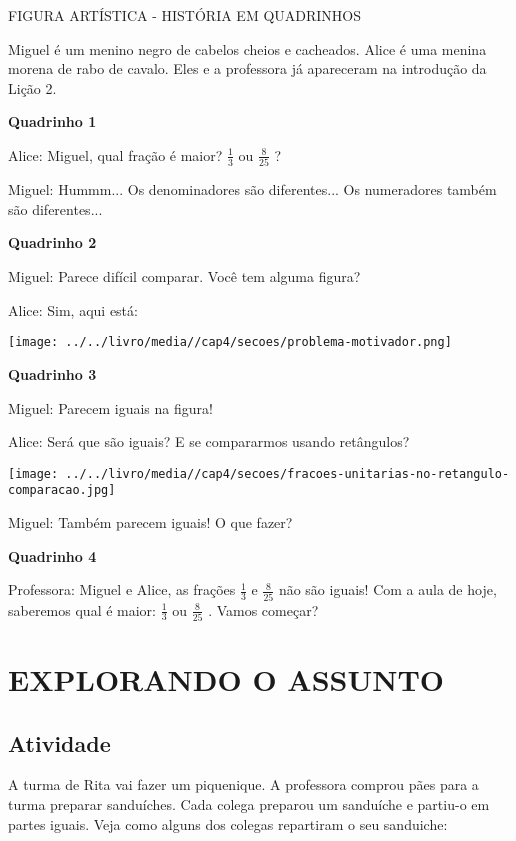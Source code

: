 \documentclass[a4,12pt]{book}
\begin{document}
\begin{imagem*}[breakable]{}{}   FIGURA ARTÍSTICA -  
  HISTÓRIA EM QUADRINHOS  
  
  Miguel é um menino negro de cabelos cheios e cacheados. Alice é uma menina morena de rabo de cavalo. Eles e a professora já apareceram na introdução da Lição 2.  
  
  {\bf Quadrinho 1}  
  
  Alice: Miguel, qual fração é maior?   $\frac{1}{3}$   ou   $\frac{8}{25}$  ?  
  
  Miguel: Hummm... Os denominadores são diferentes... Os numeradores também são diferentes...  
  
  {\bf Quadrinho 2}  
  
  Miguel: Parece difícil comparar. Você tem alguma figura?  
  
  Alice: Sim, aqui está:  
  
    \texttt{[image: ../../livro/media//cap4/secoes/problema-motivador.png]}  
  
  {\bf Quadrinho 3}  
  
  Miguel: Parecem iguais na figura!  
  
  Alice: Será que são iguais? E se compararmos usando retângulos?  
  
    \texttt{[image: ../../livro/media//cap4/secoes/fracoes-unitarias-no-retangulo-comparacao.jpg]}  
  
  Miguel: Também parecem iguais! O que fazer?  
     
  {\bf Quadrinho 4}  
  
  Professora: Miguel e Alice, as frações   $\frac{1}{3}$   e   $\frac{8}{25}$   não são iguais! Com a aula de hoje, saberemos qual é maior:    $\frac{1}{3}$   ou   $\frac{8}{25}$  . Vamos começar?  
\end{imagem*}


\section{EXPLORANDO O ASSUNTO }

\subsection{Atividade}

A turma de Rita vai fazer um piquenique. A professora comprou pães para a turma preparar sanduíches. Cada colega preparou um sanduíche e partiu-o em partes iguais. Veja como alguns dos colegas repartiram o seu sanduiche: 
\end{document}
